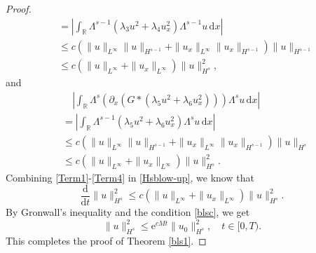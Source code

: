 \documentclass[10pt,a4paper]{amsart}
\begin{document}
\begin{proof}
\begin{equation}
\begin{aligned}
&=\left|\int_{\mathbb{R}}\Lambda^{s-1}( \lambda_3 u^2 + \lambda_4 u_x^2)\Lambda^{s-1}u \,\mathrm{d}x\right|\\
&\leq c(\|u\|_{L^\infty}\|u\|_{H^{s-1}}+\|u_x\|_{L^\infty}\|u_x\|_{H^{s-1}})\|u\|_{H^{s-1}}\\
&\leq c(\|u\|_{L^\infty}+\|u_x\|_{L^\infty})\|u\|_{H^{s}}^2,
\end{aligned}
\end{equation}
and
\begin{equation}\label{Term4}
\begin{aligned}
&\quad\left|\int_{\mathbb{R}}\Lambda^s( \partial_x(G\ast(\lambda_5 u^2 + \lambda_6 u_x^2)))\Lambda^su \,\mathrm{d}x\right|\\
&=\left|\int_{\mathbb{R}}\Lambda^{s-1}( \lambda_5 u^2 + \lambda_6 u_x^2)\Lambda^{s}u \,\mathrm{d}x\right|\\
&\leq c(\|u\|_{L^\infty}\|u\|_{H^{s-1}}+\|u_x\|_{L^\infty}\|u_x\|_{H^{s-1}})\|u\|_{H^{s}}\\
&\leq c(\|u\|_{L^\infty}+\|u_x\|_{L^\infty})\|u\|_{H^{s}}^2.
\end{aligned}
\end{equation}
Combining \eqref{Term1}-\eqref{Term4} in \eqref{Hsblow-up}, we know that
\begin{equation*}
\frac{\mathrm{d}}{\mathrm{d}t}\|u\|_{H^s}^2\leq c(\|u\|_{L^\infty}+\|u_x\|_{L^\infty})\|u\|_{H^{s}}^2.
\end{equation*}
By Gronwall's inequality and the condition \eqref{blsc}, we get
\begin{equation*}
\|u\|_{H^s}^2\leq \mathrm{e}^{cMt}\|u_0\|_{H^s}^2, \quad t\in [0,T).
\end{equation*}
This completes the proof of Theorem \ref{bls1}.
\end{proof}
\end{document}
